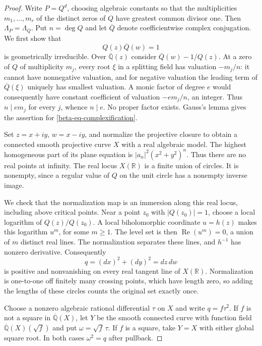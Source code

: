 \documentclass[11pt,a4paper]{article}
\theoremstyle{definition}
\theoremstyle{remark}
\numberwithin{equation}{section}
\begin{document}
\begin{proof}
Write $P=Q^d$, choosing algebraic constants so that the multiplicities
$m_1,\ldots,m_r$ of the distinct zeros of $Q$ have greatest common divisor
one.  Then $\Lambda_P=\Lambda_Q$.  Put $n=\deg Q$ and let $\overline Q$
denote coefficientwise complex conjugation.  We first show that
\begin{equation}\label{beta-eq-complexification}
Q(z)\overline Q(w)=1
\end{equation}
is geometrically irreducible.  Over $\overline{\mathbb Q}(z)$ consider
$\overline Q(w)-1/Q(z)$.  At a zero of $Q$ of multiplicity $m_j$, every
root $\xi$ in a splitting field has valuation $-m_j/n$: it cannot have
nonnegative valuation, and for negative valuation the leading term of
$\overline Q(\xi)$ uniquely has smallest valuation.  A monic factor of
degree $e$ would consequently have constant coefficient of valuation
$-em_j/n$, an integer.  Thus $n\mid em_j$ for every $j$, whence $n\mid e$.
No proper factor exists.  Gauss's lemma gives the assertion for
\eqref{beta-eq-complexification}.

Set $z=x+iy$, $w=x-iy$, and normalize the projective closure to obtain
a connected smooth projective curve $X$ with a real algebraic model.
The highest homogeneous part of its plane equation is
$|a_n|^2(x^2+y^2)^n$.  Thus there are no real points at infinity.
The real locus $X(\mathbb R)$ is a finite union of circles.  It is
nonempty, since a regular value of $Q$ on the unit circle has a nonempty
inverse image.

We check that the normalization map is an immersion along this real
locus, including above critical points.  Near a point $z_0$ with
$|Q(z_0)|=1$, choose a local logarithm of $Q(z)/Q(z_0)$.  A local
biholomorphic coordinate $u=h(z)$ makes this logarithm $u^m$, for some
$m\ge1$.  The level set is then $\operatorname{Re}(u^m)=0$, a union of
$m$ distinct real lines.  The normalization separates these lines, and
$h^{-1}$ has nonzero derivative.  Consequently
\[
q=(dx)^2+(dy)^2=dz\,dw
\]
is positive and nonvanishing on every real tangent line of $X(\mathbb R)$.
Normalization is one-to-one off finitely many crossing points, which
have length zero, so adding the lengths of these circles counts the
original set exactly once.

Choose a nonzero algebraic rational differential $\tau$ on $X$ and write
$q=f\tau^2$.  If $f$ is not a square in $\overline{\mathbb Q}(X)$, let
$Y$ be the smooth connected curve with function field
$\overline{\mathbb Q}(X)(\sqrt f)$ and put
$\omega=\sqrt f\,\tau$.  If $f$ is a square, take $Y=X$ with either global
square root.  In both cases $\omega^2=q$ after pullback.


\end{proof}
\end{document}
